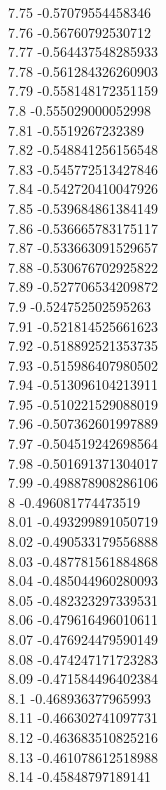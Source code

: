 {7.75	-0.57079554458346\\
7.76	-0.56760792530712\\
7.77	-0.564437548285933\\
7.78	-0.561284326260903\\
7.79	-0.558148172351159\\
7.8	-0.555029000052998\\
7.81	-0.5519267232389\\
7.82	-0.548841256156548\\
7.83	-0.545772513427846\\
7.84	-0.542720410047926\\
7.85	-0.539684861384149\\
7.86	-0.536665783175117\\
7.87	-0.533663091529657\\
7.88	-0.530676702925822\\
7.89	-0.527706534209872\\
7.9	-0.524752502595263\\
7.91	-0.521814525661623\\
7.92	-0.518892521353735\\
7.93	-0.515986407980502\\
7.94	-0.513096104213911\\
7.95	-0.510221529088019\\
7.96	-0.507362601997889\\
7.97	-0.504519242698564\\
7.98	-0.501691371304017\\
7.99	-0.498878908286106\\
8	-0.496081774473519\\
8.01	-0.493299891050719\\
8.02	-0.490533179556888\\
8.03	-0.487781561884868\\
8.04	-0.485044960280093\\
8.05	-0.482323297339531\\
8.06	-0.479616496010611\\
8.07	-0.476924479590149\\
8.08	-0.474247171723283\\
8.09	-0.471584496402384\\
8.1	-0.468936377965993\\
8.11	-0.466302741097731\\
8.12	-0.463683510825216\\
8.13	-0.461078612518988\\
8.14	-0.45848797189141\\
}
